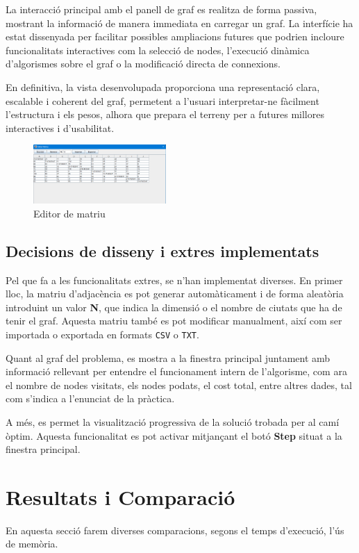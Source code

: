 \documentclass{ieeetj}
\begin{document}
La interacció principal amb el panell de graf es realitza de forma passiva, mostrant la informació de manera immediata en carregar un graf. La interfície ha estat dissenyada per facilitar possibles ampliacions futures que podrien incloure funcionalitats interactives com la selecció de nodes, l’execució dinàmica d’algorismes sobre el graf o la modificació directa de connexions.\newline

En definitiva, la vista desenvolupada proporciona una representació clara, escalable i coherent del graf, permetent a l’usuari interpretar-ne fàcilment l’estructura i els pesos, alhora que prepara el terreny per a futures millores interactives i d’usabilitat.

\begin{figure}[H]
    \centering
    \includegraphics[width=0.45\textwidth]{png/matriu.png}
    \caption{Editor de matriu}
    \label{fig:enter-label}
\end{figure}

\subsection{Decisions de disseny i extres implementats}
Pel que fa a les funcionalitats extres, se n’han implementat diverses. En primer lloc, la matriu d’adjacència es pot generar automàticament i de forma aleatòria introduint un valor \textbf{N}, que indica la dimensió o el nombre de ciutats que ha de tenir el graf. Aquesta matriu també es pot modificar manualment, així com ser importada o exportada en formats \texttt{CSV} o \texttt{TXT}.

Quant al graf del problema, es mostra a la finestra principal juntament amb informació rellevant per entendre el funcionament intern de l’algorisme, com ara el nombre de nodes visitats, els nodes podats, el cost total, entre altres dades, tal com s’indica a l’enunciat de la pràctica.

A més, es permet la visualització progressiva de la solució trobada per al camí òptim. Aquesta funcionalitat es pot activar mitjançant el botó \textbf{Step} situat a la finestra principal.

\section{Resultats i Comparació}
En aquesta secció farem diverses comparacions, segons el temps d'execució, l'ús de memòria.
\end{document}
